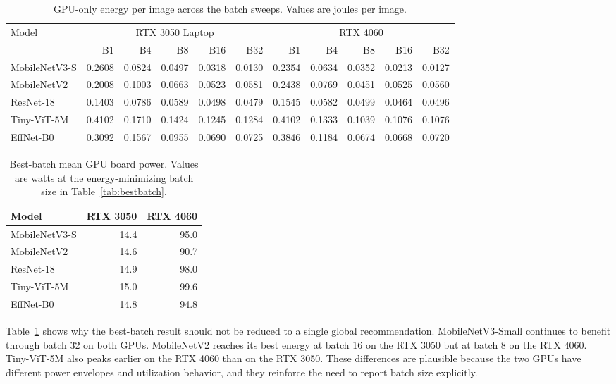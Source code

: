 \documentclass[conference]{IEEEtran}
\begin{document}
\begin{table}[t]
\centering
\caption{GPU-only energy per image across the batch sweeps. Values are joules
per image.}
\label{tab:batchcurve}
\tiny
\begin{tabular}{@{}lrrrrrrrrrr@{}}
\toprule
Model & \multicolumn{5}{c}{RTX 3050 Laptop} &
\multicolumn{5}{c}{RTX 4060}\\
\cmidrule(lr){2-6}\cmidrule(lr){7-11}
 & B1 & B4 & B8 & B16 & B32 & B1 & B4 & B8 & B16 & B32\\
\midrule
MobileNetV3-S & 0.2608 & 0.0824 & 0.0497 & 0.0318 & 0.0130 & 0.2354 & 0.0634 & 0.0352 & 0.0213 & 0.0127\\
MobileNetV2 & 0.2008 & 0.1003 & 0.0663 & 0.0523 & 0.0581 & 0.2438 & 0.0769 & 0.0451 & 0.0525 & 0.0560\\
ResNet-18 & 0.1403 & 0.0786 & 0.0589 & 0.0498 & 0.0479 & 0.1545 & 0.0582 & 0.0499 & 0.0464 & 0.0496\\
Tiny-ViT-5M & 0.4102 & 0.1710 & 0.1424 & 0.1245 & 0.1284 & 0.4102 & 0.1333 & 0.1039 & 0.1076 & 0.1076\\
EffNet-B0 & 0.3092 & 0.1567 & 0.0955 & 0.0690 & 0.0725 & 0.3846 & 0.1184 & 0.0674 & 0.0668 & 0.0720\\
\bottomrule
\end{tabular}
\end{table}

\begin{table}[t]
\centering
\caption{Best-batch mean GPU board power. Values are watts at the
energy-minimizing batch size in Table~\ref{tab:bestbatch}.}
\label{tab:bestpower}
\scriptsize
\begin{tabular}{@{}lrr@{}}
\toprule
Model & RTX 3050 & RTX 4060\\
\midrule
MobileNetV3-S & 14.4 & 95.0\\
MobileNetV2 & 14.6 & 90.7\\
ResNet-18 & 14.9 & 98.0\\
Tiny-ViT-5M & 15.0 & 99.6\\
EffNet-B0 & 14.8 & 94.8\\
\bottomrule
\end{tabular}
\end{table}

Table~\ref{tab:batchcurve} shows why the best-batch result should not be
reduced to a single global recommendation. MobileNetV3-Small continues to
benefit through batch 32 on both GPUs. MobileNetV2 reaches its best energy at
batch 16 on the RTX 3050 but at batch 8 on the RTX 4060. Tiny-ViT-5M also
peaks earlier on the RTX 4060 than on the RTX 3050. These differences are
plausible because the two GPUs have different power envelopes and utilization
behavior, and they reinforce the need to report batch size explicitly.
\end{document}
